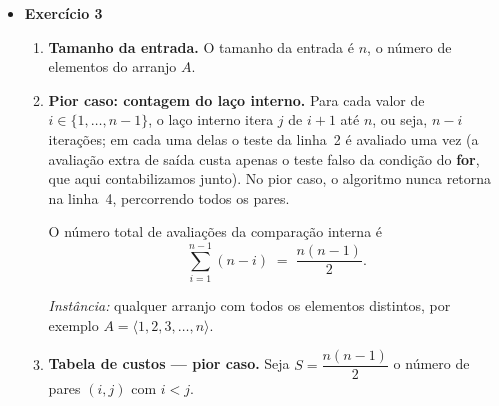 \documentclass[9pt,a4paper]{extarticle}
\begin{document}
\begin{itemize}
\begin{enumerate}[label=(\alph*)]
    \[
        \mathbb{E}[t] \;=\; \sum_{k=1}^{n} k \cdot \Pr[X = k] \;=\; \frac{1}{n}\sum_{k=1}^{n} k \;=\; \frac{1}{n} \cdot \frac{n(n+1)}{2} \;=\; \frac{n+1}{2}.
    \]

    Por linearidade da esperança aplicada a $T(n) = (c_2 + c_3)\, t + \kappa'$:
    \[
        T_{\text{med}}(n) \;=\; \mathbb{E}[T(n)] \;=\; (c_2 + c_3)\,\frac{n+1}{2} + \kappa' \;=\; \tfrac{c_2 + c_3}{2}\, n + \kappa'',
    \]
    com $\kappa''$ constante. Concluímos que $T_{\text{med}}(n) = \Theta(n)$.

    \emph{Observação:} o caso médio cresce na mesma classe do pior caso, mas com constante multiplicativa exatamente a metade.
\end{enumerate}

\item \textbf{Exercício 3}

\begin{enumerate}[label=(\alph*)]
    \item \textbf{Tamanho da entrada.} O tamanho da entrada é $n$, o número de elementos do arranjo $A$.

    \item \textbf{Pior caso: contagem do laço interno.} Para cada valor de $i \in \{1, \ldots, n-1\}$, o laço interno itera $j$ de $i+1$ até $n$, ou seja, $n - i$ iterações; em cada uma delas o teste da linha~2 é avaliado uma vez (a avaliação extra de saída custa apenas o teste falso da condição do \textbf{for}, que aqui contabilizamos junto). No pior caso, o algoritmo nunca retorna na linha~4, percorrendo todos os pares.

    O número total de avaliações da comparação interna é
    \[
        \sum_{i=1}^{n-1} (n - i) \;=\; \frac{n(n-1)}{2}.
    \]

    \emph{Instância:} qualquer arranjo com todos os elementos distintos, por exemplo $A = \langle 1, 2, 3, \ldots, n\rangle$.

    \item \textbf{Tabela de custos --- pior caso.} Seja $S = \dfrac{n(n-1)}{2}$ o número de pares $(i,j)$ com $i < j$.


\end{enumerate}
\end{itemize}
\end{document}
